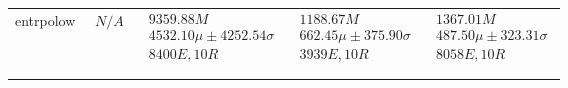 \begin{tabular}{|l|p{3.2cm}|p{3.2cm}|p{3.2cm}|p{3.2cm}|}
entrpolow & $\begin{array}{c} N/A \end{array}$ & $\begin{array}{c} 9359.88M \\ 4532.10\mu \pm 4252.54\sigma \\ 8400E, 10R \end{array}$ & $\begin{array}{c} 1188.67M \\ 662.45\mu \pm 375.90\sigma \\ 3939E, 10R \end{array}$ & $\begin{array}{c} 1367.01M \\ 487.50\mu \pm 323.31\sigma \\ 8058E, 10R \end{array}$ \\ \\ \hline
\bottomrule \\ \hline
\end{tabular}
